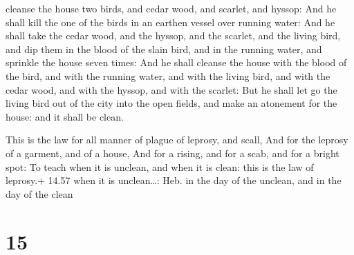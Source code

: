 cleanse the house two birds, and cedar wood, and scarlet, and hyssop:
 And he shall kill the one of the birds in an earthen
vessel over running water:  And he shall take the cedar
wood, and the hyssop, and the scarlet, and the living bird, and dip them
in the blood of the slain bird, and in the running water, and sprinkle
the house seven times:  And he shall cleanse the house with
the blood of the bird, and with the running water, and with the living
bird, and with the cedar wood, and with the hyssop, and with the
scarlet:  But he shall let go the living bird out of the
city into the open fields, and make an atonement for the house: and it
shall be clean.

 This is the law for all manner of plague of leprosy, and
scall,  And for the leprosy of a garment, and of a house,
 And for a rising, and for a scab, and for a bright spot:
 To teach when it is unclean, and when it is clean: this is
the law of leprosy.+ 14.57 when it is unclean\ldots: Heb. in the day of
the unclean, and in the day of the clean

\hypertarget{section-14}{%
\section{15}\label{section-14}}

